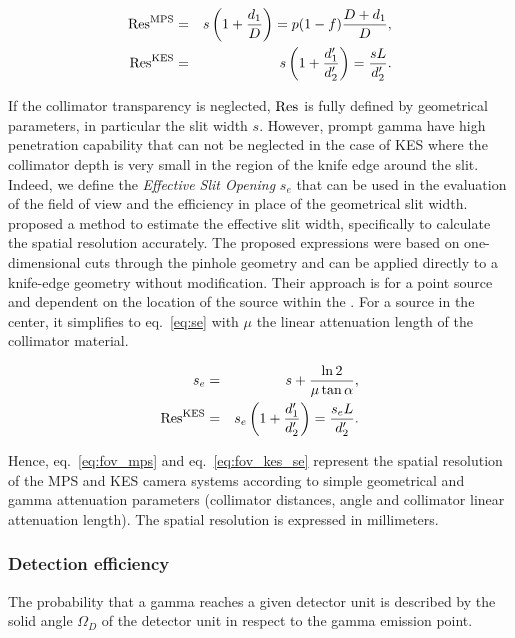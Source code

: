 \documentclass[a4paper,english,12pt]{article}
\begin{document}
\begin{eqnarray}
  \label{eq:fov_mps}
  \textrm{Res}_{}^{\textrm{MPS}} & = & s\left(1+ \frac{d_1}{D}\right) = p(1-f) \frac{D+d_1}{D}, \\
  \label{eq:fov_kes}
   \textrm{Res}_{}^{\textrm{KES}} & = & s\left(1+ \frac{d_1'}{d_2'}\right) = \frac{sL}{d_2'}.
\end{eqnarray}

If the collimator transparency is neglected, $\textrm{Res}_{}$ is fully defined by geometrical parameters, in particular the slit width $s$. However, prompt gamma have high penetration capability that can not be neglected in the case of KES where the collimator depth is very small in the region of the knife edge around the slit. Indeed, we define the \textit{Effective Slit Opening} $s_e$ that can be used in the evaluation of the field of view and the efficiency in place of the geometrical slit width. \cite{Metzler2005}
proposed a method to estimate the effective slit width, specifically to calculate
the spatial resolution accurately. The proposed expressions were based on
one-dimensional cuts through the pinhole geometry and can be applied directly to
a knife-edge geometry without modification. Their approach is for a point source
and dependent on the location of the source within the \FOV. For a source in the
center, it simplifies to eq.~\ref{eq:se} with $\mu$ the linear attenuation
length of the collimator material.

\begin{eqnarray}
  s_e & = & s + \frac{\ln2}{\mu\tan\alpha}   \label{eq:se}, \\
   \textrm{Res}_{}^{\textrm{KES}} & = & s_e\left(1+ \frac{d_1'}{d_2'}\right) = \frac{s_eL}{d_2'}.
  \label{eq:fov_kes_se}
\end{eqnarray}

Hence, eq.~\ref{eq:fov_mps} and eq.~\ref{eq:fov_kes_se} represent the spatial resolution of the MPS and KES camera systems according to simple geometrical and gamma attenuation parameters (collimator distances, angle and collimator linear attenuation length). The spatial resolution is expressed in millimeters. 

\subsubsection{Detection efficiency}

The probability that a gamma reaches a given detector unit is described by the solid angle $\Omega_D$ of the detector unit in respect to the gamma emission point.
\end{document}
